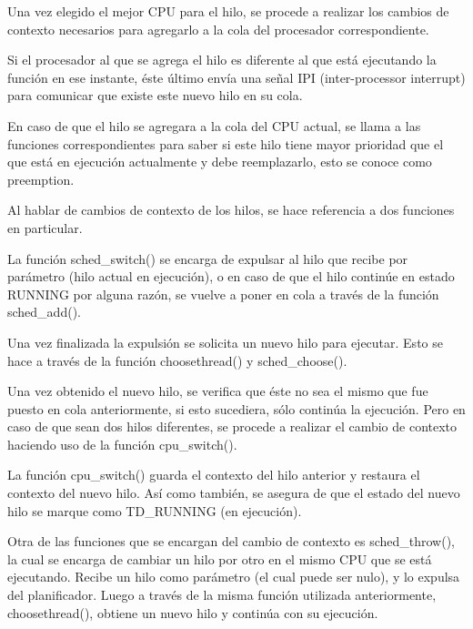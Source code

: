 Una vez elegido el mejor CPU para el hilo, se procede a realizar los cambios de contexto necesarios para agregarlo a la cola del procesador correspondiente.

Si el procesador al que se agrega el hilo es diferente al que está ejecutando la función en ese instante, éste último envía una señal IPI (inter-processor interrupt) para comunicar que existe este nuevo hilo en su cola.

En caso de que el hilo se agregara a la cola del CPU actual, se llama a las funciones correspondientes para saber si este hilo tiene mayor prioridad que el que está en ejecución actualmente y debe reemplazarlo, esto se conoce como preemption.

Al hablar de cambios de contexto de los hilos, se hace referencia a dos funciones en particular.\par

La función sched\_switch() se encarga de expulsar al hilo que recibe por parámetro (hilo actual en ejecución), o en caso de que el hilo continúe en estado RUNNING por alguna razón, se vuelve a poner en cola a través de la función sched\_add().\par

Una vez finalizada la expulsión se solicita un nuevo hilo para ejecutar. Esto se hace a través de la función choosethread() y sched\_choose().\par

Una vez obtenido el nuevo hilo, se verifica que éste no sea el mismo que fue puesto en cola anteriormente, si esto sucediera, sólo continúa la ejecución. Pero en caso de que sean dos hilos diferentes, se procede a realizar el cambio de contexto haciendo uso de la función cpu\_switch().\par

La función cpu\_switch() guarda el contexto del hilo anterior y restaura el contexto del nuevo hilo. Así como también, se asegura de que el estado del nuevo hilo se marque como TD\_RUNNING (en ejecución).\par

Otra de las funciones que se encargan del cambio de contexto es sched\_throw(), la cual se encarga de cambiar un hilo por otro en el mismo CPU que se está ejecutando. Recibe un hilo como parámetro (el cual puede ser nulo), y lo expulsa del planificador. Luego a través de la misma función utilizada anteriormente, choosethread(), obtiene un nuevo hilo y continúa con su ejecución.\par

